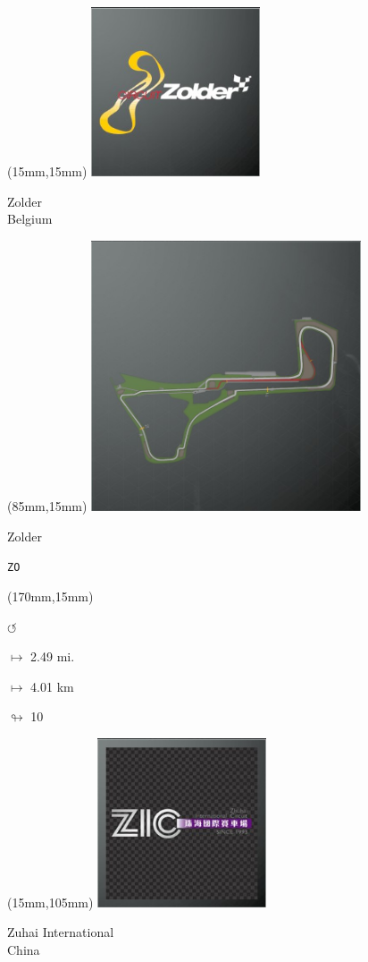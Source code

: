 \begin{textblock*}{60mm}(15mm,15mm)%
\includegraphics[width=50mm]{LG/2015-05-20_00100.png}
\par Zolder\\ Belgium
\end{textblock*}
\begin{textblock*}{80mm}(85mm,15mm)%
\includegraphics[width=80mm]{TR/2015-05-20_00071.png}
\centerline{Zolder}
\par\hfill\tiny\tt ZO\\
\end{textblock*}
\begin{textblock*}{30mm}(170mm,15mm)%
\par \Huge$\circlearrowleft$
\Large
\par$\mapsto$ 2.49 mi.
\par$\mapsto$ 4.01 km
\par$\looparrowright$ 10
\end{textblock*}
\begin{textblock*}{60mm}(15mm,105mm)%
\includegraphics[width=50mm]{LG/2015-05-20_00099.png}
\par Zuhai International\\ China
\end{textblock*}
